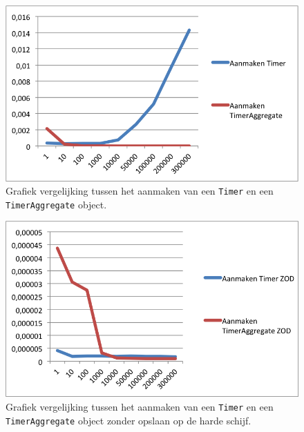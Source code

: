 \begin{figure}[!h]
  \centering
  \includegraphics[scale=1.0]{Afbeeldingen/Evaluatie/TimerVSAggregate}
  \caption{Grafiek vergelijking tussen het aanmaken van een \texttt{Timer} en een \texttt{TimerAggregate} object.}
  \label{fig:TimerVSAggregate}
\end{figure}

\begin{figure}[!h]
  \centering
  \includegraphics[scale=1.0]{Afbeeldingen/Evaluatie/TimerVSAggregateZOD}
  \caption{Grafiek vergelijking tussen het aanmaken van een \texttt{Timer} en een \texttt{TimerAggregate} object zonder opslaan op de harde schijf.}
  \label{fig:TimerVSAggregateZOD}
\end{figure}

